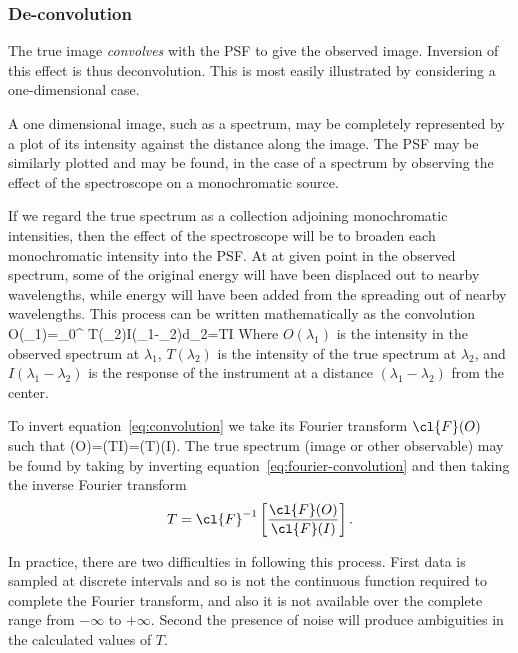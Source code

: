 \subsubsection{De-convolution}

The true image {\it convolves} with the PSF to give the observed image. Inversion of this effect is thus deconvolution. This is most easily illustrated by considering a one-dimensional case. 

A one dimensional image, such as a spectrum, may be completely represented by a plot of its intensity against the distance along the image. The PSF may be similarly plotted and may be found, in the case of a spectrum by observing the effect of the spectroscope on a monochromatic source. 

If we regard the true spectrum as a collection adjoining monochromatic intensities, then the effect of the spectroscope will be to broaden each monochromatic intensity into the PSF. At at given point in the observed spectrum, some of the original energy will have been displaced out to nearby wavelengths, while energy will have been added from the spreading out of nearby wavelengths. This process can be written mathematically as the convolution
\be
O(\lambda_1)=\int_0^{\infty} T(\lambda_2)I(\lambda_1-\lambda_2)d\lambda_2=T\otimes I
\label{eq:convolution}
\ee
Where $O(\lambda_1)$ is the intensity in the observed spectrum at $\lambda_1$, $T(\lambda_2)$ is the intensity of the true spectrum at $\lambda_2$, and $I(\lambda_1-\lambda_2)$ is the response of the instrument at a distance $(\lambda_1-\lambda_2)$ from the center.

To invert equation~\ref{eq:convolution} we take its Fourier transform $\cl{F}(O)$ such that
\be
{}(O)=(T\otimes I)=(T)\times{}(I).
\label{eq:fourier-convolution}
\ee
The true spectrum (image or other observable) may be found by taking by inverting equation~\ref{eq:fourier-convolution} and then taking the inverse Fourier transform
\[
T=\cl{F}^{-1}\left[{\cl{F}(O)\over\cl{F}(I)}\right].
\]

In practice, there are two difficulties in following this process. First data is sampled at discrete intervals and so is not the continuous function required to complete the Fourier transform, and also it is not available over the complete range from $-\infty$ to $+\infty$. Second the presence of noise will produce ambiguities in the calculated values of $T$.

